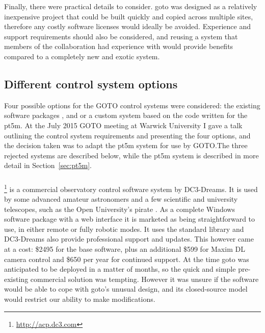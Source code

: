 \begin{colsection}
\begin{colsection}
Finally, there were practical details to consider. \gls{goto} was designed as a relatively inexpensive project that could be built quickly and copied across multiple sites, therefore any costly software licenses would ideally be avoided. Experience and support requirements should also be considered, and reusing a system that members of the collaboration had experience with would provide benefits compared to a completely new and exotic system.

\end{colsection}


\subsection{Different control system options}
\label{sec:control_options}
\begin{colsection}

Four possible options for the GOTO control systems were considered: the existing software packages ,  and  or a custom system based on the code written for the \gls{pt5m}. At the July 2015 GOTO meeting at Warwick University I gave a talk outlining the control system requirements and presenting the four options, and the decision taken was to adapt the \gls{pt5m} system for use by GOTO.\@ The three rejected systems are described below, while the \gls{pt5m} system is described in more detail in Section~\ref{sec:pt5m}.

\subsubsection{}
\footnote{\url{http://acp.dc3.com}} is a commercial observatory control software system by DC3-Dreams. It is used by some advanced amateur astronomers and a few scientific and university telescopes, such as the Open University's \gls{pirate} \citep{PIRATE}. As a complete Windows software package with a web interface it is marketed as being straightforward to use, in either remote or fully robotic modes. It uses the  standard library and DC3-Dreams also provide professional support and updates. This however came at a cost: \$2495 for the base software, plus an additional \$599 for Maxim DL camera control and \$650 per year for continued support. At the time \gls{goto} was anticipated to be deployed in a matter of months, so the quick and simple pre-existing commercial solution was tempting. However it was unsure if the  software would be able to cope with \gls{goto}'s unusual design, and its closed-source model would restrict our ability to make modifications.


\end{colsection}
\end{colsection}
